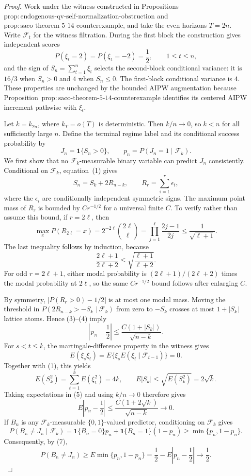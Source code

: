 \documentclass{article}
\begin{document}
\begin{proof}
Work under the witness constructed in Propositions~\(\mathrm{prop:endogenous\text{-}qv\text{-}self\text{-}normalization\text{-}obstruction}\) and~\(\mathrm{prop:saco\text{-}theorem\text{-}5\text{-}14\text{-}counterexample}\), and take the even horizons \(T=2n\).  Write \(\mathcal F_t\) for the witness filtration.  During the first block the construction gives independent scores
\[
 P(\xi_t=2)=P(\xi_t=-2)=\frac12,
 \qquad 1\le t\le n,
\tag{1}
\]
and the sign of \(S_n=\sum_{t=1}^n\xi_t\) selects the second-block conditional variance: it is \(16/3\) when \(S_n>0\) and \(4\) when \(S_n\le0\).  The first-block conditional variance is \(4\).  These properties are unchanged by the bounded AIPW augmentation because Proposition~\(\mathrm{prop:saco\text{-}theorem\text{-}5\text{-}14\text{-}counterexample}\) identifies its centered AIPW increment pathwise with \(\xi_t\).

Let \(k=k_{2n}\), where \(k_T=o(T)\) is deterministic.  Then \(k/n\to0\), so \(k<n\) for all sufficiently large \(n\).  Define the terminal regime label and its conditional success probability by
\[
 J_n=\mathbf 1\{S_n>0\},
 \qquad
 p_n=P(J_n=1\mid\mathcal F_k).
\tag{2}
\]
We first show that no \(\mathcal F_k\)-measurable binary variable can predict \(J_n\) consistently.  Conditional on \(\mathcal F_k\), equation~(1) gives
\[
 S_n=S_k+2R_{n-k},
 \qquad
 R_r=\sum_{i=1}^r\epsilon_i,
\tag{3}
\]
where the \(\epsilon_i\) are conditionally independent symmetric signs.  The maximum point mass of \(R_r\) is bounded by \(C r^{-1/2}\) for a universal finite \(C\).  To verify rather than assume this bound, if \(r=2\ell\), then
\[
 \max_xP(R_{2\ell}=x)
 =2^{-2\ell}\binom{2\ell}{\ell}
 =\prod_{j=1}^{\ell}\frac{2j-1}{2j}
 \le\frac1{\sqrt{\ell+1}}.
\tag{4}
\]
The last inequality follows by induction, because
\[
 \frac{2\ell+1}{2\ell+2}
 \le \sqrt{\frac{\ell+1}{\ell+2}}.
\]
For odd \(r=2\ell+1\), either modal probability is \((2\ell+1)/(2\ell+2)\) times the modal probability at \(2\ell\), so the same \(Cr^{-1/2}\) bound follows after enlarging \(C\).

By symmetry, \(|P(R_r>0)-1/2|\) is at most one modal mass.  Moving the threshold in \(P(2R_{n-k}>-S_k\mid\mathcal F_k)\) from zero to \(-S_k\) crosses at most \(1+|S_k|\) lattice atoms.  Hence (3)--(4) imply
\[
 \left|p_n-\frac12\right|
 \le \frac{C(1+|S_k|)}{\sqrt{n-k}}.
\tag{5}
\]
For \(s<t\le k\), the martingale-difference property in the witness gives
\[
 E(\xi_s\xi_t)
 =E\{\xi_sE(\xi_t\mid\mathcal F_{t-1})\}=0.
\]
Together with (1), this yields
\[
 E(S_k^2)=\sum_{t=1}^kE(\xi_t^2)=4k,
 \qquad
 E|S_k|\le\sqrt{E(S_k^2)}=2\sqrt{k}.
\tag{6}
\]
Taking expectations in (5) and using \(k/n\to0\) therefore gives
\[
 E\left|p_n-\frac12\right|
 \le \frac{C(1+2\sqrt{k})}{\sqrt{n-k}}
 \longrightarrow0.
\tag{7}
\]
If \(B_n\) is any \(\mathcal F_k\)-measurable \(\{0,1\}\)-valued predictor, conditioning on \(\mathcal F_k\) gives
\[
 P(B_n\ne J_n\mid\mathcal F_k)
 =\mathbf1\{B_n=0\}p_n+
   \mathbf1\{B_n=1\}(1-p_n)
 \ge \min\{p_n,1-p_n\}.
\]
Consequently, by (7),
\[
 P(B_n\ne J_n)
 \ge E\min\{p_n,1-p_n\}
 =\frac12-E\left|p_n-\frac12\right|
 \longrightarrow\frac12.
\tag{8}
\]


\end{proof}
\end{document}

